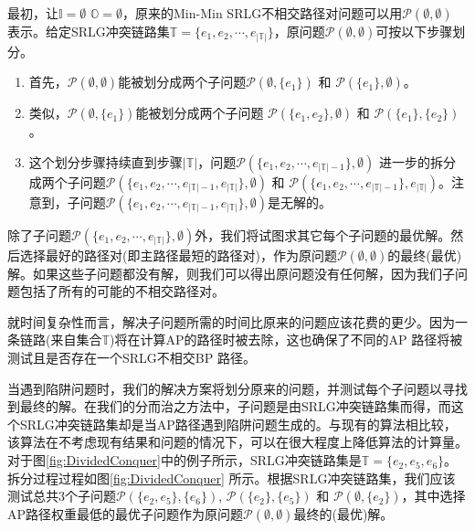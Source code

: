 最初，让$\mathbb{I}=\emptyset$ ${\mathbb{O}}=\emptyset$，原来的Min-Min SRLG不相交路径对问题可以用$\mathcal{P}(\emptyset,\emptyset)$ 表示。给定SRLG冲突链路集$\mathbb{T}=\{{e_1},{e_2}, \cdots ,{e_{\left| \mathbb{T} \right|}}\}$，原问题$\mathcal{P}(\emptyset,\emptyset)$可按以下步骤划分。

\begin{enumerate}
  \item 首先，$\mathcal{P}(\emptyset,\emptyset)$能被划分成两个子问题$\mathcal{P}(\emptyset,\{e_1\})$ 和 $\mathcal{P}(\{e_1\},\emptyset)$。
  \item 类似，$\mathcal{P}(\emptyset,\{e_1\})$能被划分成两个子问题 $\mathcal{P}(\{e_1,e_2\},\emptyset)$ 和 $\mathcal{P}(\{e_1\},\{e_2\})$。
  \item 这个划分步骤持续直到步骤$|\mathbb{T}|$，问题$\mathcal{P}(\{e_1,e_2,\cdots ,{e_{\left| \mathbb{T} \right|-1}}\},\emptyset)$ 进一步的拆分成两个子问题$\mathcal{P}(\{e_1,e_2,\cdots ,{e_{\left| \mathbb{T} \right|-1}}, {e_{\left| \mathbb{T} \right|}}\},\emptyset)$ 和 $\mathcal{P}(\{e_1,e_2,\cdots ,{e_{\left| \mathbb{T} \right|-1}}\},{e_{\left| \mathbb{T} \right|}})$。注意到，子问题$\mathcal{P}(\{e_1,e_2,\cdots ,{e_{\left| \mathbb{T} \right|-1}}, {e_{\left| \mathbb{T} \right|}}\},\emptyset)$是无解的。
\end{enumerate}



除了子问题$\mathcal{P}(\{e_1,e_2,\cdots ,{e_{\left| \mathbb{T} \right|}}\},\emptyset)$外，我们将试图求其它每个子问题的最优解。然后选择最好的路径对(即主路径最短的路径对)，作为原问题$\mathcal{P}(\emptyset,\emptyset)$的最终(最优)解。如果这些子问题都没有解，则我们可以得出原问题没有任何解，因为我们子问题包括了所有的可能的不相交路径对。

就时间复杂性而言，解决子问题所需的时间比原来的问题应该花费的更少。因为一条链路(来自集合$\mathbb{T}$)将在计算AP的路径时被去除，这也确保了不同的AP 路径将被测试且是否存在一个SRLG不相交BP 路径。

当遇到陷阱问题时，我们的解决方案将划分原来的问题，并测试每个子问题以寻找到最终的解。在我们的分而治之方法中，子问题是由SRLG冲突链路集而得，而这个SRLG冲突链路集却是当AP路径遇到陷阱问题生成的。与现有的算法相比较，该算法在不考虑现有结果和问题的情况下，可以在很大程度上降低算法的计算量。对于图\ref{fig:DividedConquer}中的例子所示，SRLG冲突链路集是$\mathbb{T}=\{e_2,e_5,e_6\}$。拆分过程过程如图\ref{fig:DividedConquer} 所示。根据SRLG冲突链路集，我们应该测试总共3个子问题${{\mathcal{P}}(\{ e_2,e_5\} ,\{ e_6\} )}$, ${{\mathcal{P}}(\{ e_2\} ,\{ e_5\} )}$ 和 ${{\mathcal{P}}(\emptyset ,\{ e_2\} )}$，其中选择AP路径权重最低的最优子问题作为原问题$\mathcal{P}(\emptyset,\emptyset)$最终的(最优)解。

